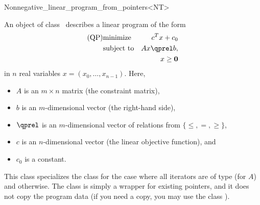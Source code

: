 \begin{ccRefClass}{Nonnegative_linear_program_from_pointers<NT>}


\ccDefinition
An object of class \ccRefName\ describes a linear program of the form
\begin{eqnarray*}
\mbox{(QP)}& \mbox{minimize} & c^{T}x+c_0 \\
&\mbox{subject to}   & Ax\qprel b, \\
&                    & x \geq \mathbf{0}
\end{eqnarray*}
in $n$ real variables $x=(x_0,\ldots,x_{n-1})$.
Here, 
\begin{itemize}
\item $A$ is an $m\times n$ matrix (the constraint matrix), 
\item $b$ is an $m$-dimensional vector (the right-hand side),
\item $\qprel$ is an $m$-dimensional vector of relations 
from $\{\leq, =, \geq\}$, 
\item $c$ is an $n$-dimensional vector (the linear objective
  function), and 
\item $c_0$ is a constant.
\end{itemize}

This class specializes the class
for the case where all iterators are of type  (for
$A$) and  otherwise. The class is simply a wrapper for 
existing pointers, and it does not copy the program data (if you need
a copy, you may use the class ).

\ccIsModel
{}

\ccSeeAlso
{}\\

\end{ccRefClass}
